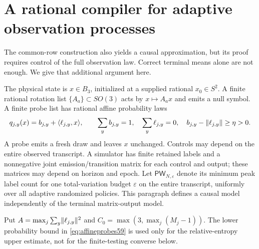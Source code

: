 \section{A rational compiler for adaptive observation processes}
\label{sec:adaptivecompiler59}
The common-row construction also yields a causal approximation, but its
proof requires control of the full observation law. Correct terminal
means alone are not enough. We give that additional argument here.

The physical state is $x\in B_3$, initialized at a supplied rational
$x_0\in S^2$. A finite rational rotation list $\{A_a\}\subset SO(3)$
acts by $x\mapsto A_ax$ and emits a null symbol. A finite probe list has
rational affine probability laws
\begin{equation}\label{eq:affineprobes59}
 q_{j,y}(x)=b_{j,y}+\langle \ell_{j,y},x\rangle,\qquad
 \sum_y b_{j,y}=1,\quad \sum_y\ell_{j,y}=0,
 \quad b_{j,y}-\lVert \ell_{j,y}\rVert\ge\eta>0.
\end{equation}
A probe emits a fresh draw and leaves $x$ unchanged. Controls may depend
on the entire observed transcript. A simulator has finite retained
labels and a nonnegative joint emission/transition matrix for each
control and output; these matrices may depend on horizon and epoch.
Let $\mathsf{PW}_{N,\varepsilon}$ denote its minimum peak label count
for one total-variation budget $\varepsilon$ on the entire transcript,
uniformly over all adaptive randomized policies. This paragraph defines
a causal model independently of the terminal matrix-output model.

Put $A=\max_j\sum_y\lVert \ell_{j,y}\rVert^2$ and
$C_0=\max(3,\max_j(M_j-1))$. The lower probability bound in
\eqref{eq:affineprobes59} is used only for the relative-entropy upper
estimate, not for the finite-testing converse below.

